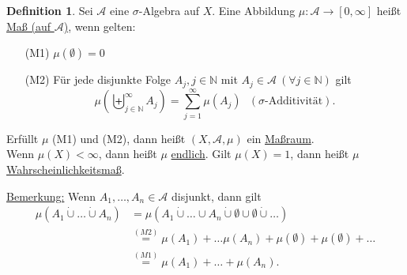 \documentclass[a4paper]{scrreprt}
\newcommand{\N}{\mathbb{N}}
\newcommand{\dcup}{\dot{\cup}}
\newcommand{\bigdcup}{\biguplus}
\newcommand{\jlabel}[1]{\label{j_#1}}
\newcommand{\jspace}{\vspace{8pt}}
\theoremstyle{plain}
\theoremstyle{definition}
\newtheorem{defn}[thm]{Definition}
\begin{document}
{{\begin{defn}
\jlabel{Def 1.12}
    Sei $\mathcal{A}$ eine $\sigma$-Algebra auf $X$. Eine Abbildung $\mu: \mathcal{A} \rightarrow [0, \infty]$ heißt \uline{Maß (auf $\mathcal{A}$)}, wenn gelten:
    \begin{itemize}
        \item[(M1)] $\mu(\emptyset) = 0$
        \item[(M2)] Für jede disjunkte Folge $A_j, j\in\N$ mit $A_j \in \mathcal{A} \ (\forall j\in\N)$ gilt
        \begin{displaymath}
            \mu \left(\bigdcup_{j \in\N}^\infty A_j \right) = \sum_{j=1}^\infty \mu(A_j)\ \ \  (\sigma\text{-Additivität}).
        \end{displaymath}
    \end{itemize}
    Erfüllt $\mu$ (M1) und (M2), dann heißt $(X, \mathcal{A}, \mu)$ ein \uline{Maßraum}.\\
    Wenn $\mu(X) < \infty$, dann heißt $\mu$ \uline{endlich}. Gilt $\mu(X) = 1$, dann heißt $\mu$ \\ \uline{Wahrscheinlichkeitsmaß}.
    
    \jspace
    
    \uline{Bemerkung:} Wenn $A_1, \dots, A_n \in \mathcal{A}$ disjunkt, dann gilt
    \begin{displaymath}
        \begin{split}
            \mu(A_1 \dcup \dots \dcup A_n) &= \mu(A_1 \dcup \dots \cup A_n \dcup \emptyset \cup \emptyset \dcup \dots)\\
            &\overset{(M2)}{=} \mu(A_1) + \dots \mu(A_n) + \mu(\emptyset) + \mu(\emptyset) + \dots\\
            &\overset{(M1)}{=} \mu(A_1) + \dots + \mu(A_n).
        \end{split}
    \end{displaymath}
\end{defn}


}}
\end{document}
